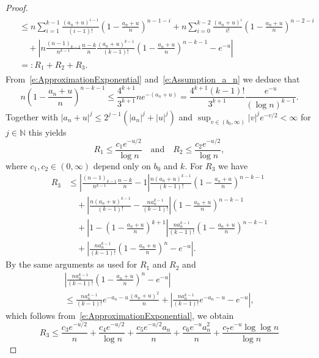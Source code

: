 \documentclass[AHL,Unicode,longabstracts]{cedram}
\newcommand*\N{\mathbb{N}}
\begin{document}
\begin{proof}
\begin{multline*}
\begin{aligned}
& \leq n \sum_{i=1}^{k-1} \frac{\left(a_n+u\right)^{i-1}}{(i-1)!} \left(1 - \frac{a_n+u}{n} \right)^{n-1-i} + n \sum_{i=0}^{k-2} \frac{(a_n+u)^i}{i!} \left(1 - \frac{a_n+u}{n} \right)^{n-2-i} \\
& \quad + \left|n \frac{(n-1)_{k-1}}{n^{k-1}} \frac{n-k}{n} \frac{(a_n+u)^{k-1}}{(k-1)!} \left(1 - \frac{a_n+u}{n} \right)^{n-k-1} - e^{-u} \right| \\
& =: R_1+R_2+R_3.
\end{aligned}
\end{multline*}
From~\eqref{e:ApproximationExponential} and~\eqref{e:Assumption_a_n} we deduce that
\[
n\left(1 - \frac{a_n+u}{n} \right)^{n-k-1} \leq \frac{4^{k+1}}{3^{k+1}} n e^{-(a_n+u)}= \frac{4^{k+1} (k-1)!}{3^{k+1}} \frac{e^{-u}}{(\log n)^{k-1}}.
\]
Together with $|a_n+u|^j\leq 2^{j-1} (|a_n|^j + |u|^j)$ and $\sup_{v\in (b_0,\infty)} |v|^j e^{-v/2}<\infty$ for $j\in\N$ this yields
\[
R_1 \leq \frac{c_1 e^{-u/2}}{\log n} \quad \text{and} \quad R_2 \leq \frac{c_2 e^{-u/2}}{\log n},
\]
where $c_1,c_2\in(0,\infty)$ depend only on $b_0$ and $k$. For $R_3$ we have
\begin{align*}
R_3 & \leq \left| \frac{(n-1)_{k-1}}{n^{k-1}} \frac{n-k}{n} - 1 \right| \frac{n (a_n+u)^{k-1}}{(k-1)!} \left(1 - \frac{a_n+u}{n} \right)^{n-k-1} \\
& \quad + \left| \frac{n (a_n+u)^{k-1}}{(k-1)!} - \frac{n a_n^{k-1}}{(k-1)!} \right| \left(1 - \frac{a_n+u}{n} \right)^{n-k-1} \\
& \quad + \left| 1 - \left(1 - \frac{a_n+u}{n} \right)^{k+1} \right| \frac{n a_n^{k-1}}{(k-1)!} \left(1 - \frac{a_n+u}{n} \right)^{n-k-1}\\
&\quad + \left| \frac{n a_n^{k-1}}{(k-1)!} \left(1 - \frac{a_n+u}{n} \right)^{n} - e^{-u} \right|.
\end{align*}
By the same arguments as used for $R_1$ and $R_2$ and
\begin{multline*}
\left| \frac{n a_n^{k-1}}{(k-1)!} \left(1 - \frac{a_n+u}{n} \right)^{n} - e^{-u} \right|\\
\leq \frac{n a_n^{k-1}}{(k-1)!} e^{-a_n-u} \frac{\left(a_n+u\right)^2}{n} + \left| \frac{n a_n^{k-1}}{(k-1)!} e^{-a_n-u} - e^{-u} \right|,
\end{multline*}
which follows from~\eqref{e:ApproximationExponential}, we obtain
\[
R_3 \leq \frac{c_3 e^{-u/2}}{n} + \frac{c_4 e^{-u/2}}{\log n} + \frac{c_5 e^{-u/2} a_n}{n} + \frac{c_6 e^{-u} a_n^2}{n} + \frac{c_7 e^{-u} \log\log n}{\log n}
\]
\vspace{10pt}
\pagebreak


\end{proof}
\end{document}
